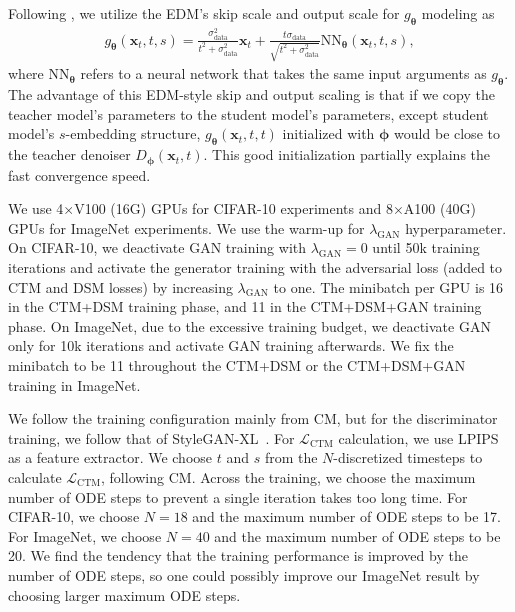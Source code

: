 \documentclass{article} \usepackage{iclr2024_coNFErence,times}
\theoremstyle{definition}
\theoremstyle{remark}
\begin{document}
Following \citet{karras2022elucidating}, we utilize the EDM's skip scale and output scale for $g_{\bm{\theta}}$ modeling as
\begin{align*}
    g_{\bm{\theta}}(\mathbf{x}_{t},t,s)=\frac{\sigma_{\text{data}}^{2}}{t^{2}+\sigma_{\text{data}}^{2}}\mathbf{x}_{t}+\frac{t\sigma_{\text{data}}}{\sqrt{t^{2}+\sigma_{\text{data}}^{2}}}\text{NN}_{\bm{\theta}}(\mathbf{x}_{t},t,s),
\end{align*}
where $\text{NN}_{\bm{\theta}}$ refers to a neural network that takes the same input arguments as $g_{\bm{\theta}}$.
The advantage of this EDM-style skip and output scaling is that if we copy the teacher model's parameters to the student model's parameters, except student model's $s$-embedding structure, $g_{\bm{\theta}}(\mathbf{x}_{t},t,t)$ initialized with $\bm{\phi}$ would be close to the teacher denoiser $D_{\bm{\phi}}(\mathbf{x}_{t},t)$. This good initialization partially explains the fast convergence speed.

We use 4$\times$V100 (16G) GPUs for CIFAR-10 experiments and 8$\times$A100 (40G) GPUs for ImageNet experiments. We use the warm-up for $\lambda_{\text{GAN}}$ hyperparameter. On CIFAR-10, we deactivate GAN training with $\lambda_{\text{GAN}}=0$ until 50k training iterations and activate the generator training with the adversarial loss (added to CTM and DSM losses) by increasing $\lambda_{\text{GAN}}$ to one. The minibatch per GPU is 16 in the CTM+DSM training phase, and 11 in the CTM+DSM+GAN training phase. On ImageNet, due to the excessive training budget, we deactivate GAN only for 10k iterations and activate GAN training afterwards. We fix the minibatch to be 11 throughout the CTM+DSM or the CTM+DSM+GAN training in ImageNet.

We follow the training configuration mainly from CM, but for the discriminator training, we follow that of StyleGAN-XL~\citep{sauer2022stylegan}. For $\mathcal{L}_{\text{CTM}}$ calculation, we use LPIPS~\citep{zhang2018unreasonable} as a feature extractor. We choose $t$ and $s$ from the $N$-discretized timesteps to calculate $\mathcal{L}_{\text{CTM}}$, following CM. Across the training, we choose the maximum number of ODE steps to prevent a single iteration takes too long time. For CIFAR-10, we choose $N=18$ and the maximum number of ODE steps to be 17. For ImageNet, we choose $N=40$ and the maximum number of ODE steps to be 20. We find the tendency that the training performance is improved by the number of ODE steps, so one could possibly improve our ImageNet result by choosing larger maximum ODE steps.
\end{document}

